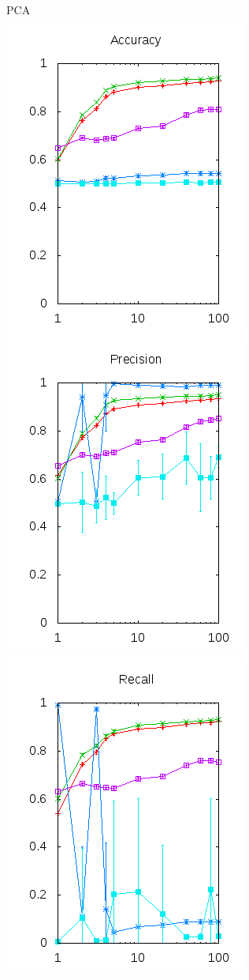 \documentclass[10pt, a4paper]{article}
\begin{document}
\begin{figure}[H]
  \begin{minipage}{1\textwidth}
  \center PCA\\
	\includegraphics[scale=0.5]{../src/data/acpca.png}
	\includegraphics[scale=0.5]{../src/data/prpca.png}
	\includegraphics[scale=0.5]{../src/data/repca.png}

\end{minipage}
\end{figure}
\end{document}
